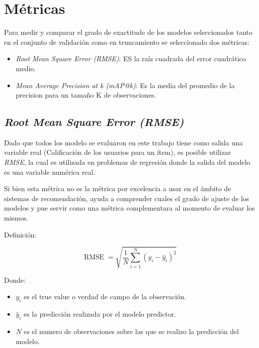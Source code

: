 \documentclass[11pt,a4paper,twoside]{thesis}
\begin{document}
\section{Métricas}

Para medir y comparar el grado de exactitude de los modelos seleccionados tanto
en el conjunto de validación como en truncamiento se seleccionado dos métricas:

\begin{itemize}
	\item \textit{Root Mean Square Error (RMSE)}: ES la raíz cuadrada del error cuadrático medio.
	\item \textit{Mean Average Precision at k (mAP@k)}: Es la media del promedio de la precision  para un tamaño K de observaciones.
\end{itemize}

\subsection{\textit{Root Mean Square Error (RMSE)}}

Dado que todos los modelo se evaluaron en este trabajo tiene como salida una
variable real (Calificación de los usuarios para un ítem), es posible utilizar
\textit{RMSE}, la cual es utilizada en problemas de regresión donde la salida
del modelo es una variable numérica real.

Si bien esta métrica no es la métrica por excelencia a usar en el ámbito de
sistemas de recomendación, ayuda a comprender cuales el grado de ajuste de los
modelos y pue servir como una métrica complementara al momento de evaluar los
mismos.

\begin{description}
	\item[Definición:]
\end{description}
\begin{equation}
	\operatorname{RMSE}=\sqrt{  \frac{1}{N} \sum_{i=1}^N (y_i - \hat y_i)^2}
\end{equation}
\begin{description}
	\item[Donde:]
\end{description}
\begin{itemize}
	\item $y_i$ es el true value o verdad de campo de la observación.
	\item $\hat y_i$ es la predicción realizada por el modelo predictor.
	\item $N$ es el numero de observaciones sobre las que se realizo la predicción del modelo.
\end{itemize}
\end{document}
